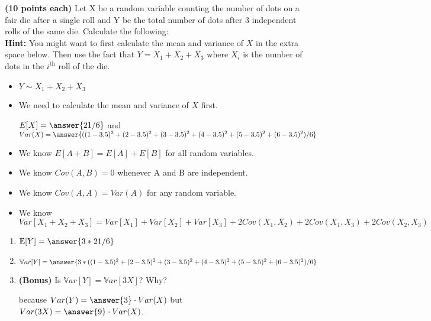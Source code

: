 \documentclass{ximera}
\begin{document}
\begin{problem} { \bf (10 points each)} 
Let X be a random variable counting the number of dots on a fair die after a single roll and Y be the total number of dots after 3 independent rolls of the same die.  Calculate the following:
\\
{\bf Hint:} You might want to first calculate the mean and variance of $X$ in the extra space below. Then use the fact that $Y=X_1+X_2+X_3$ where $X_i$ is the number of dots in the $i^{\text{th}}$ roll of the die.


\begin{explanation}
\begin{itemize}
    \item $Y\sim X_1+X_2+X_3$
    \item We need to calculate the mean and variance of $X$ first.
 
 $E[X]=\answer{21/6}$ and $Var(X)=\answer{((1-3.5)^2+(2-3.5)^2+(3-3.5)^2+(4-3.5)^2+(5-3.5)^2+(6-3.5)^2)/6}$
    \item We know $E[A+B]=E[A]+E[B]$ for all random variables.
    \item We know $Cov(A,B)=0$ whenever A and B are independent.
    \item We know $Cov(A,A)=Var(A)$ for any random variable.
    \item We know
$$Var[X_1+X_2+X_3]=Var[X_1]+Var[X_2]+Var[X_3]+2Cov(X_1,X_2)+2Cov(X_1,X_3)+2Cov(X_2,X_3)   $$
\end{itemize}
\end{explanation} 

\begin{enumerate}
    \item $\mathbb E[Y]=\answer{3*21/6}$
    
    \item $\mathbb Var[Y]=\answer{3*((1-3.5)^2+(2-3.5)^2+(3-3.5)^2+(4-3.5)^2+(5-3.5)^2+(6-3.5)^2)/6}$


    \item {\bf (Bonus)} Is $\mathbb Var[Y]=\mathbb Var[3X]$? Why?
    \begin{multipleChoice}
    \end{multipleChoice}
    because $Var(Y)=\answer{3}\cdot Var(X)$ but $Var(3X)=\answer{9}\cdot Var(X)$.
    \vspace{2cm}
\end{enumerate}
\end{problem}
\end{document}
